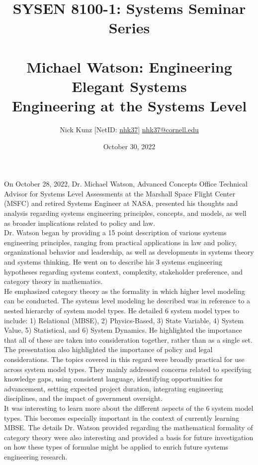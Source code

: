 \documentclass[11pt]{article}
\begin{document}
\title{SYSEN 8100-1: Systems Seminar Series\\~\\
    \Large Michael Watson: Engineering Elegant Systems\\Engineering at the Systems Level
}
\author{
    Nick Kunz [NetID: \url{nhk37}] \hyperlink{nhk37@cornell.edu}{nhk37@cornell.edu}
}
\date{October 30, 2022}
\maketitle

On October 28, 2022, Dr. Michael Watson, Advanced Concepts Office Technical
Advisor for Systems Level Assessments at the Marshall Space Flight Center (MSFC) and retired Systems Engineer at NASA, presented his thoughts and analysis regarding systems engineering principles, concepts, and models, as well as broader implications related to policy and law. \\

Dr. Watson began by providing a 15 point description of various systems engineering principles, ranging from practical applications in law and policy, organizational behavior and leadership, as well as developments in systems theory and systems  thinking. He went on to describe his 3 systems engineering hypotheses regarding systems context, complexity, stakeholder preference, and category theory in mathematics. \\

He emphasized category theory as the formality in which higher level modeling can be conducted. The systems level modeling he described was in reference to a nested hierarchy of system model types. He detailed 6 system model types to include: 1) Relational (MBSE), 2) Physics-Based, 3) State Variable, 4) System Value, 5) Statistical, and 6) System Dynamics. He highlighted the importance that all of these are taken into consideration together, rather than as a single set. \\

The presentation also highlighted the importance of policy and legal considerations. The topics covered in this regard were broadly practical for use across system model types. They mainly addressed concerns related to specifying knowledge gaps, using consistent language, identifying opportunities for advancement, setting expected project duration, integrating engineering disciplines, and the impact of government oversight. \\

It was interesting to learn more about the different aspects of the 6 system model types. This becomes especially important in the context of currently learning MBSE. The details Dr. Watson provided regarding the mathematical formality of category theory were also interesting and provided a basis for future investigation on how these types of formulae might be applied to enrich future systems engineering research.
\end{document}
